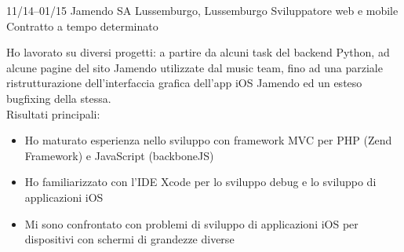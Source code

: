 \documentclass[print]{friggeri-custom} %
\begin{document}
\begin{entrylist}

\expentry
{11/14--01/15}
{Jamendo SA}
{Lussemburgo, Lussemburgo}
{Sviluppatore web e mobile}
{Contratto a tempo determinato}
{Ho lavorato su diversi progetti: a partire da alcuni task del backend Python, ad alcune pagine del sito Jamendo utilizzate dal music team, fino ad una parziale ristrutturazione dell'interfaccia grafica dell'app iOS Jamendo ed un esteso bugfixing della stessa. \\
Risultati principali:
\begin{itemize}
  \item Ho maturato esperienza nello sviluppo con framework MVC per PHP (Zend Framework) e JavaScript (backboneJS)
  \item Ho familiarizzato con l'IDE Xcode per lo sviluppo debug e lo sviluppo di applicazioni iOS
\end{itemize}}


\entry
{}
{}
{}
{\begin{itemize}
  \item Mi sono confrontato con problemi di sviluppo di applicazioni iOS per dispositivi con schermi di grandezze diverse
\end{itemize}}



\end{entrylist}
\end{document}
